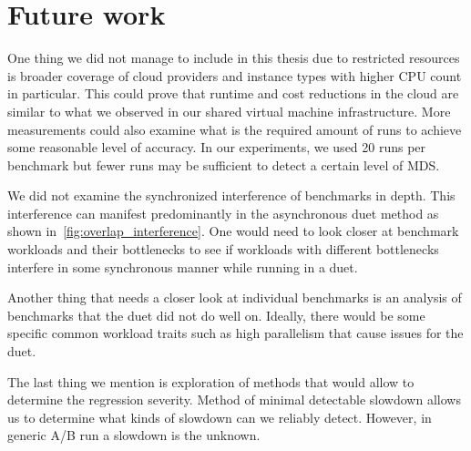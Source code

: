 \section*{Future work}
One thing we did not manage to include in this thesis due to restricted resources is broader coverage of cloud providers and instance types with higher CPU count in particular.
This could prove that runtime and cost reductions in the cloud are similar to what we observed in our shared virtual machine infrastructure.
More measurements could also examine what is the required amount of runs to achieve some reasonable level of accuracy.
In our experiments, we used 20 runs per benchmark but fewer runs may be sufficient to detect a certain level of MDS.

We did not examine the synchronized interference of benchmarks in depth.
This interference can manifest predominantly in the asynchronous duet method as shown in~\cref{fig:overlap_interference}.
One would need to look closer at benchmark workloads and their bottlenecks to see if workloads with different bottlenecks interfere in some synchronous manner while running in a duet.

Another thing that needs a closer look at individual benchmarks is an analysis of benchmarks that the duet did not do well on.
Ideally, there would be some specific common workload traits such as high parallelism that cause issues for the duet.

The last thing we mention is exploration of methods that would allow to determine the regression severity.
Method of minimal detectable slowdown allows us to determine what kinds of slowdown can we reliably detect.
However, in generic A/B run a slowdown is the unknown.
